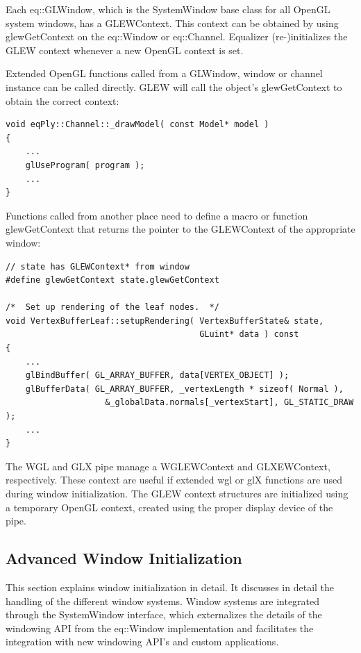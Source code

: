 \documentclass[10pt,a4]{scrartcl}
\begin{document}
Each \textsf{eq::GLWindow}, which is the \textsf{SystemWindow} base class for
all OpenGL system windows, has a \textsf{GLEWContext}. This context can be
obtained by using \textsf{glewGetContext} on the \textsf{eq::Window} or
\textsf{eq::Channel}. Equalizer (re-)initializes the GLEW context whenever a new
OpenGL context is set.

Extended OpenGL functions called from a GLWindow, window or channel instance can
be called directly. GLEW will call the object's \textsf{glewGetContext} to
obtain the correct context:

{\footnotesize\begin{lstlisting}
void eqPly::Channel::_drawModel( const Model* model )
{
    ...
    glUseProgram( program );
    ...
}
\end{lstlisting}}

Functions called from another place need to define a macro or function
\textsf{glewGetContext} that returns the pointer to the GLEWContext of
the appropriate window:

{\footnotesize\begin{lstlisting}
// state has GLEWContext* from window
#define glewGetContext state.glewGetContext

/*  Set up rendering of the leaf nodes.  */
void VertexBufferLeaf::setupRendering( VertexBufferState& state,
                                       GLuint* data ) const
{
    ...
    glBindBuffer( GL_ARRAY_BUFFER, data[VERTEX_OBJECT] );
    glBufferData( GL_ARRAY_BUFFER, _vertexLength * sizeof( Normal ),
                    &_globalData.normals[_vertexStart], GL_STATIC_DRAW );
    ...
}
\end{lstlisting}}

The WGL and GLX pipe manage a WGLEWContext and GLXEWContext, respectively. These
context are useful if extended wgl or glX functions are used during window
initialization. The GLEW context structures are initialized using a temporary
OpenGL context, created using the proper display device of the pipe.

\subsection{Advanced Window Initialization}

This section explains window initialization in detail. It discusses in
detail the handling of the different window systems. Window systems are
integrated through the \textsf{SystemWindow} interface, which externalizes
the details of the windowing API from the \textsf{eq::Window}
implementation and facilitates the integration with new windowing API's
and custom applications.
\end{document}
